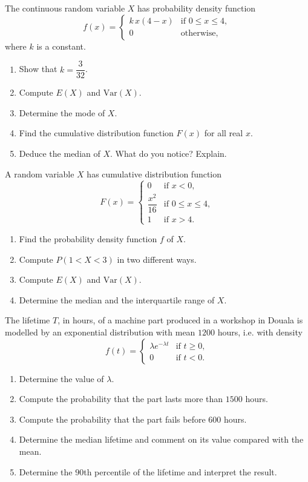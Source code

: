 \documentclass[11pt]{article}
\newcounter{popsec}
\newcounter{popsub}
\newcommand{\courssub}[1]{%
  \stepcounter{popsub}%
  \par\vspace{9pt}\noindent{\popxbold\fontsize{11.5}{13}\selectfont\color{popink}{\color{poporange}\thepopsec.\thepopsub}\hspace{6pt}#1}\par\nopagebreak\vspace{4pt}
}
\begin{document}
\courssub{I practise}

\begin{exercice}
The continuous random variable $X$ has probability density function
\[
f(x)=\begin{cases} k\,x(4-x) & \text{if } 0\leq x\leq 4,\\ 0 & \text{otherwise,}\end{cases}
\]
where $k$ is a constant.
\begin{enumerate}
\item Show that $k=\dfrac{3}{32}$.
\item Compute $E(X)$ and $\mathrm{Var}(X)$.
\item Determine the mode of $X$.
\item Find the cumulative distribution function $F(x)$ for all real $x$.
\item Deduce the median of $X$. What do you notice? Explain.
\end{enumerate}
\end{exercice}

\begin{exercice}
A random variable $X$ has cumulative distribution function
\[
F(x)=\begin{cases} 0 & \text{if } x<0,\\ \dfrac{x^2}{16} & \text{if } 0\leq x\leq 4,\\ 1 & \text{if } x>4.\end{cases}
\]
\begin{enumerate}
\item Find the probability density function $f$ of $X$.
\item Compute $P(1<X<3)$ in two different ways.
\item Compute $E(X)$ and $\mathrm{Var}(X)$.
\item Determine the median and the interquartile range of $X$.
\end{enumerate}
\end{exercice}

\begin{exercice}
The lifetime $T$, in hours, of a machine part produced in a workshop in Douala is modelled by an exponential distribution with mean $1200$ hours, i.e. with density
\[
f(t)=\begin{cases} \lambda e^{-\lambda t} & \text{if } t\geq 0,\\ 0 & \text{if } t<0.\end{cases}
\]
\begin{enumerate}
\item Determine the value of $\lambda$.
\item Compute the probability that the part lasts more than $1500$ hours.
\item Compute the probability that the part fails before $600$ hours.
\item Determine the median lifetime and comment on its value compared with the mean.
\item Determine the $90$th percentile of the lifetime and interpret the result.
\end{enumerate}
\end{exercice}
\end{document}
